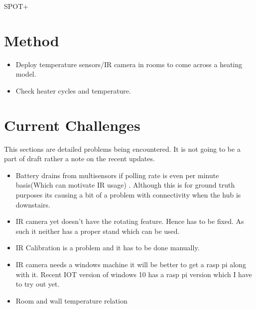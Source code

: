 \documentclass{sig-alternate}
\begin{document}
SPOT+





\section{Method}


\begin{itemize} 
\item Deploy temperature sensors/IR camera in rooms to come across a heating model.

\item Check heater cycles and temperature.


\end{itemize}

\section{Current Challenges}

 This sections are detailed problems being encountered. It is not going to be a part of draft rather a note on the recent updates. 

\begin{itemize} 
\item Battery drains from multisensors if polling rate is even per minute basis(Which can motivate IR usage) . Although this is for ground truth purposes its causing a bit of a problem with connectivity when the hub is downstairs.

\item  IR camera yet doesn't have the rotating feature. Hence has to be fixed. As such it neither has a proper stand which can be used.

\item IR Calibration is a problem and it has to be done manually.

\item IR camera needs a windows machine it will be better to get a rasp pi along with it. Recent IOT version of windows 10 has a rasp pi version which I have to try out yet. 

\item Room and wall temperature relation
\end{itemize}
\end{document}
